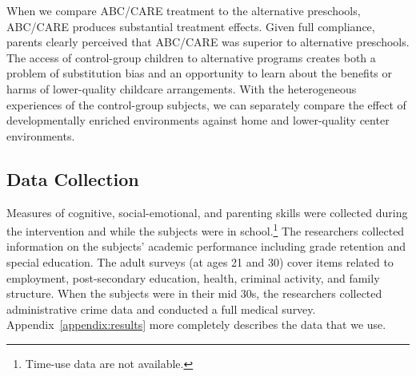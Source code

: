 When we compare ABC/CARE treatment to the alternative preschools, ABC/CARE produces substantial treatment effects. Given full compliance, parents clearly perceived that ABC/CARE was superior to alternative preschools. The access of control-group children to alternative programs creates both a problem of substitution bias \citep{Heckman_1992_randomization,Heckman_Hohmann_etal_2000_QJE, Kline_Walters_2016_QJE} and an opportunity to learn about the benefits or harms of lower-quality childcare arrangements. With the heterogeneous experiences of the control-group subjects, we can separately compare the effect of developmentally enriched environments against home and lower-quality center environments.

\subsection{Data Collection}

Measures of cognitive, social-emotional, and parenting skills were collected during the intervention and while the subjects were in school.\footnote{Time-use data are not available.} The researchers collected information on the subjects' academic performance including grade retention and special education. The adult surveys (at ages 21 and 30) cover items related to employment, post-secondary education, health, criminal activity, and family structure. When the subjects were in their mid 30s, the researchers collected administrative crime data and conducted a full medical survey. Appendix~\ref{appendix:results} more completely describes the data that we use.


